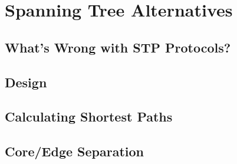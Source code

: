 \chapter{Spanning Tree Alternatives}

\section{What's Wrong with STP Protocols?}
 \label{spanning_tree:whats_wrong}

\section{Design}

\section{Calculating Shortest Paths}

\section{Core/Edge Separation}


